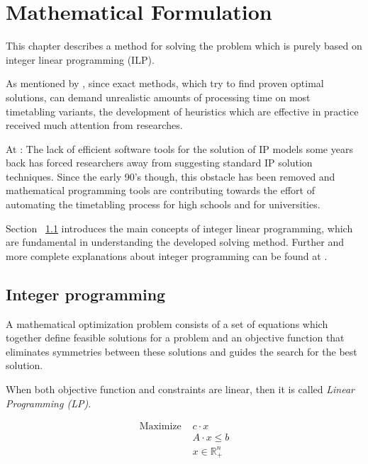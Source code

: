 \chapter{Mathematical Formulation}
\label{chap:mipformulation}



This chapter describes a method for solving the problem which is purely based on integer linear programming (ILP).

As mentioned by \cite{Haroldo2012}, since exact methods, which try to find proven optimal solutions, can demand unrealistic amounts of processing time on most timetabling variants, the development of heuristics which are effective in practice received much attention from researches.

At \cite{Birbas2009}: The lack of efficient software tools for the solution of IP models some years back has forced researchers away from suggesting standard IP solution techniques. Since the early 90's though, this obstacle has been removed and mathematical programming tools are contributing towards the effort of automating the timetabling process for high schools and for universities.

Section ~\ref{IP} introduces the main concepts of integer linear programming, which are fundamental in understanding the developed solving method. Further and more complete explanations about integer programming can be found at \cite{Wolsey98}.


\section{Integer programming}
\label{IP}

A mathematical optimization problem consists of a set of equations which together define feasible solutions for a problem and an objective function that eliminates symmetries between these solutions and guides the search for the best solution.

When both objective function and constraints are linear, then it is called \textit{Linear Programming (LP)}.

\begin{subequations}
\label{eq:LP}
\begin{align}
   \mbox{Maximize } & c \cdot x
								\\ & A \cdot x \le b
								\\ & x \in \mathbb{R}^{n}_{+}
\end{align}
\end{subequations}

